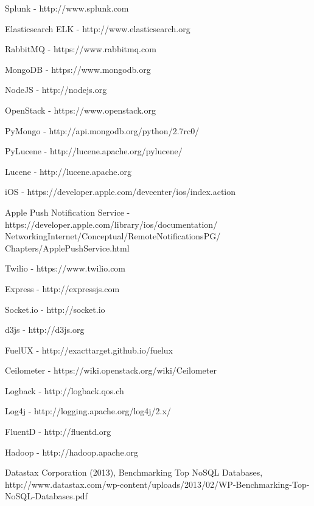 \documentclass[10pt, a4paper, conference, compsocconf]{IEEEtran}
\begin{document}
%
%
%
\begin{thebibliography}{1}

    Splunk - http://www.splunk.com

    Elasticsearch ELK - http://www.elasticsearch.org

    RabbitMQ - https://www.rabbitmq.com

    MongoDB - https://www.mongodb.org

    NodeJS - http://nodejs.org

    OpenStack - https://www.openstack.org

    PyMongo - http://api.mongodb.org/python/2.7rc0/

    PyLucene - http://lucene.apache.org/pylucene/

    Lucene - http://lucene.apache.org

    iOS - https://developer.apple.com/devcenter/ios/index.action

    Apple Push Notification Service -
    https://developer.apple.com/library/ios/documentation/
      NetworkingInternet/Conceptual/RemoteNotificationsPG/
      Chapters/ApplePushService.html

    Twilio - https://www.twilio.com

    Express - http://expressjs.com

    Socket.io - http://socket.io

    d3js - http://d3js.org

    FuelUX - http://exacttarget.github.io/fuelux

    Ceilometer - https://wiki.openstack.org/wiki/Ceilometer

    Logback - http://logback.qos.ch

    Log4j - http://logging.apache.org/log4j/2.x/

    FluentD - http://fluentd.org

    Hadoop - http://hadoop.apache.org

    Datastax Corporation (2013), Benchmarking Top NoSQL Databases, http://www.datastax.com/wp-content/uploads/2013/02/WP-Benchmarking-Top-NoSQL-Databases.pdf

\end{thebibliography}

\end{document}
